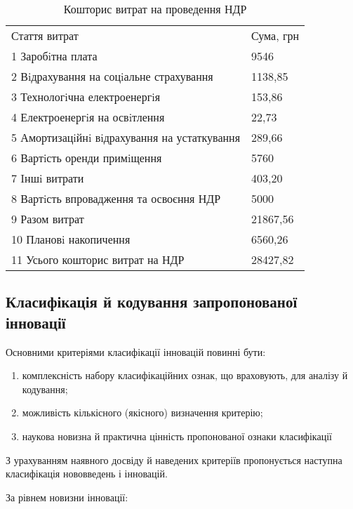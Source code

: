 \newpage

\begin{table}[hbt]
	\captionstyle{ \raggedright}
	\caption{Кошторис витрат на проведення НДР}\label{tab:sumNDR}
	\begin{tabular}{|p{}|p{}|}
		\hline
		Стаття витрат & Сума, грн \\
		\hlinewd{2pt}
		1 Заробiтна плата & 9546  \\
		\hline
		2 Вiдрахування на соцiальне страхування & 1138,85 \\
		\hline
		3 Технологiчна електроенергiя & 153,86 \\
		\hline
		4 Електроенергiя на освiтлення & 22,73 \\
		\hline
		5 Амортизацiйнi вiдрахування на устаткування & 289,66 \\
		\hline
		6 Вартiсть оренди примiщення & 5760 \\
		\hline
		7 Iншi витрати & 403,20 \\
		\hline
		8 Вартiсть впровадження та освоєння НДР & 5000 \\
		\hline
		9 Разом витрат & 21867,56 \\
		\hline
		10 Плановi накопичення & 6560,26 \\
		\hline
		11 Усього кошторис витрат на НДР & 28427,82  \\
		\hline
	\end{tabular}
\end{table}

\subsection{Класифікація й кодування запропонованої інновації}

Основними критеріями класифікації інновацій повинні бути:

\begin{enumerate}
	\item комплексність набору класифікаційних ознак, що враховують, для аналізу й кодування;
	\item можливість кількісного (якісного) визначення критерію;
	\item наукова новизна й практична цінність пропонованої ознаки класифікації
\end{enumerate}

З урахуванням наявного досвіду й наведених критеріїв пропонується наступна класифікація нововведень і інновацій.

За рівнем новизни інновації:

